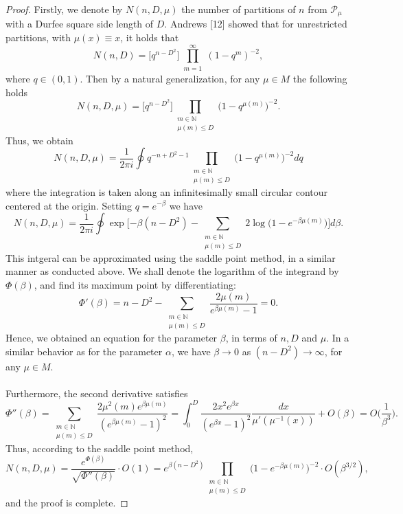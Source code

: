 \documentclass[pdflatex,sn-mathphys-num]{sn-jnl}%
\theoremstyle{thmstyleone}%
\theoremstyle{thmstyletwo}%
\theoremstyle{thmstylethree}%
\theoremstyle{thmstylethree}%
\theoremstyle{thmstylethree}%
\begin{document}
\begin{proof}
    Firstly, we denote by $N(n,D,\mu)$ the number of partitions of $n$ from $\mathcal{P_{\mu}}$ with a Durfee square side length of $D$. Andrews [12] showed that for unrestricted partitions, with $\mu(x)\equiv x$, it holds that
    \begin{equation*}
        N(n,D)=\big[q^{n-D^2}\big]\prod_{\substack{m=1}}^\infty(1-q^{m})^{-2},
    \end{equation*}
    where $q\in(0,1)$. Then by a natural generalization, for any $\mu\in M$ the following holds
    \begin{equation}
        N(n,D,\mu)=\big[q^{n-D^2}\big]\prod_{\substack{m\in\mathbb{N} \\ \mu(m)\le D}}\big(1-q^{\mu(m)}\big)^{-2}.
    \end{equation}
    Thus, we obtain
    \begin{equation*}
        N(n,D,\mu)=\frac{1}{2\pi i}\oint q^{-n+D^2-1}\prod_{\substack{m\in\mathbb{N} \\ \mu(m)\le D}}\big(1-q^{\mu(m)}\big)^{-2}dq
    \end{equation*}
    where the integration is taken along an infinitesimally small circular contour centered at the origin. Setting $q=e^{-\beta}$ we have
    \begin{equation*}
        N(n,D,\mu)=\frac{1}{2\pi i}\oint \exp\bigg[{-\beta(n-D^2)-\sum_{\substack{m\in\mathbb{N} \\ \mu(m)\le D}} 2\log\big(1-e^{-\beta \mu(m)}\big)}\bigg]d\beta.
    \end{equation*}
    This intgeral can be approximated using the saddle point method, in a similar manner as conducted above. We shall denote the logarithm of the integrand by $\Phi(\beta)$, and find its maximum point by differentiating:
    \begin{equation*}
        \Phi'(\beta)=n-D^2-\sum_{\substack{m\in\mathbb{N} \\ \mu(m)\le D}}\frac{2\mu(m)}{e^{\beta\mu(m)}-1}=0.
    \end{equation*}
    Hence, we obtained an equation for the parameter $\beta$, in terms of $n, D$ and $\mu$. In a similar behavior as for the parameter $\alpha$, we have $\beta\to0$ as $(n-D^2)\to\infty$, for any $\mu\in M$. \\
    \\
    Furthermore, the second derivative satisfies
    \begin{equation}\label{second-der}
        \Phi''(\beta)=\sum_{\substack{m\in\mathbb{N} \\ \mu(m)\le D}}\frac{2\mu^2(m)e^{\beta\mu(m)}}{(e^{\beta\mu(m)}-1)^2}=\int_0^D\frac{2x^2e^{\beta x}}{(e^{\beta x} -1)^2}\frac{dx}{\mu'(\mu^{-1}(x))} + O(\beta)=O\Big(\frac{1}{\beta^3}\Big).
    \end{equation}
    Thus, according to the saddle point method,
\begin{equation*}
    N(n,D,\mu)=\frac{e^{\Phi(\beta)}}{\sqrt{\Phi''(\beta)}}\cdot O(1)=e^{\beta(n-D^2)}\prod_{\substack{m\in\mathbb{N} \\ \mu(m)\le D}}\big(1-e^{-\beta\mu(m)}\big)^{-2} \cdot O(\beta^{3/2}),
\end{equation*}
and the proof is complete.
\end{proof}
\end{document}
